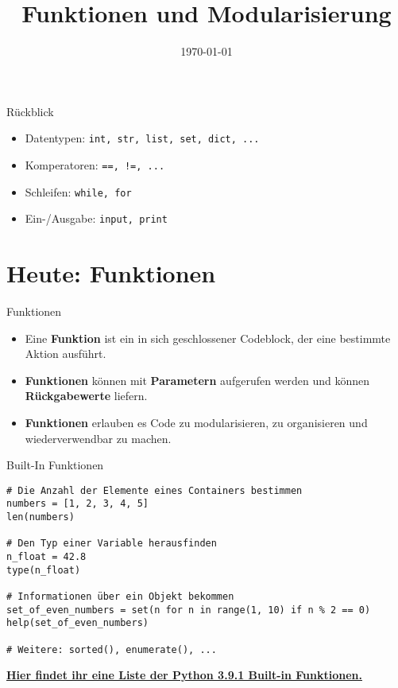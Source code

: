 



\title{Funktionen und Modularisierung}
\date{\today}



\maketitle

\begin{frame}{Rückblick}
    \begin{itemize}
        \item Datentypen: \texttt{int, str, list, set, dict, ...}
        \item Komperatoren: \texttt{==, !=, ...}
        \item Schleifen: \texttt{while, for}
        \item Ein-/Ausgabe: \texttt{input, print}
    \end{itemize}
\end{frame}

\section{Heute: Funktionen}

\begin{frame}{Funktionen}
    \begin{itemize}
        \item Eine \textbf{Funktion} ist ein in sich geschlossener Codeblock, der eine bestimmte Aktion ausführt.
        \item \textbf{Funktionen} können mit \textbf{Parametern} aufgerufen werden und können \textbf{Rückgabewerte} liefern.
        \item \textbf{Funktionen} erlauben es Code zu \alert{modularisieren}, zu \alert{organisieren} und \alert{wiederverwendbar} zu machen.
    \end{itemize}
\end{frame}

\begin{frame}[fragile]{Built-In Funktionen}
\begin{lstlisting}
# Die Anzahl der Elemente eines Containers bestimmen
numbers = [1, 2, 3, 4, 5]
len(numbers)

# Den Typ einer Variable herausfinden
n_float = 42.8
type(n_float)

# Informationen über ein Objekt bekommen
set_of_even_numbers = set(n for n in range(1, 10) if n % 2 == 0)
help(set_of_even_numbers)

# Weitere: sorted(), enumerate(), ...
\end{lstlisting}
\textbf{\href{https://docs.python.org/3/library/functions.html}{Hier findet ihr eine Liste der Python 3.9.1 Built-in Funktionen.}}
\end{frame}

